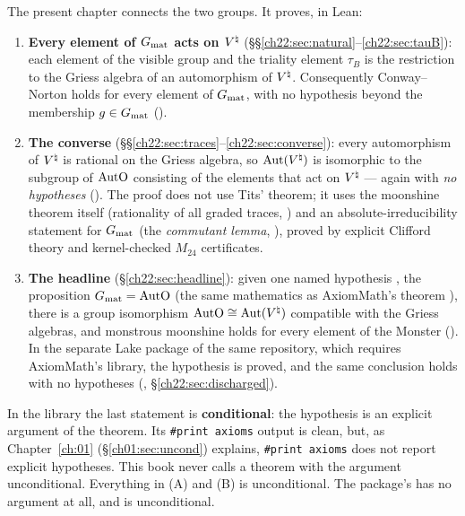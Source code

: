 The present chapter connects the two groups.  It proves, in Lean:
\begin{enumerate}[label=(\Alph*)]
\item \textbf{Every element of $G_{\mathrm{mat}}$ acts on ${V^{\natural}}$} (\S\S\ref{ch22:sec:natural}--\ref{ch22:sec:tauB}):
  each element of the visible group and the triality element $\tau_B$ is the restriction to the Griess algebra of an
  automorphism of ${V^{\natural}}$.  Consequently Conway--Norton holds for every element of $G_{\mathrm{mat}}$, with
  no hypothesis beyond the membership $g\in G_{\mathrm{mat}}$ ().
\item \textbf{The converse} (\S\S\ref{ch22:sec:traces}--\ref{ch22:sec:converse}): every automorphism of ${V^{\natural}}$ is
  rational on the Griess algebra, so $\operatorname{Aut}({V^{\natural}})$ is isomorphic to the subgroup of $\mathrm{AutO}$ consisting of
  the elements that act on ${V^{\natural}}$ --- again with \emph{no hypotheses}
  ().  The proof does not use Tits' theorem; it uses the moonshine theorem
  itself (rationality of all graded traces, ) and an absolute-irreducibility statement for
  $G_{\mathrm{mat}}$ (the \emph{commutant lemma}, ), proved by explicit Clifford theory and
  kernel-checked $M_{24}$ certificates.
\item \textbf{The headline} (\S\ref{ch22:sec:headline}): given one named hypothesis
  , the proposition $G_{\mathrm{mat}}=\mathrm{AutO}$ (the same mathematics as AxiomMath's theorem
  ), there is a group isomorphism $\mathrm{AutO}\cong\operatorname{Aut}({V^{\natural}})$ compatible with the Griess algebras, and monstrous
  moonshine holds for every element of the Monster ().  In the separate Lake package
   of the same repository, which requires AxiomMath's library, the hypothesis is proved, and the
  same conclusion holds with no hypotheses (, \S\ref{ch22:sec:discharged}).
\end{enumerate}
In the library the last statement is \textbf{conditional}: the hypothesis  is an explicit argument of
the theorem.  Its \texttt{\#print axioms} output is clean, but, as Chapter~\ref{ch:01} (\S\ref{ch01:sec:uncond}) explains,
\texttt{\#print axioms} does not report explicit hypotheses.  This book never calls a theorem with the argument
 unconditional.  Everything in (A) and (B) is unconditional.  The package's
 has no argument at all, and is unconditional.

